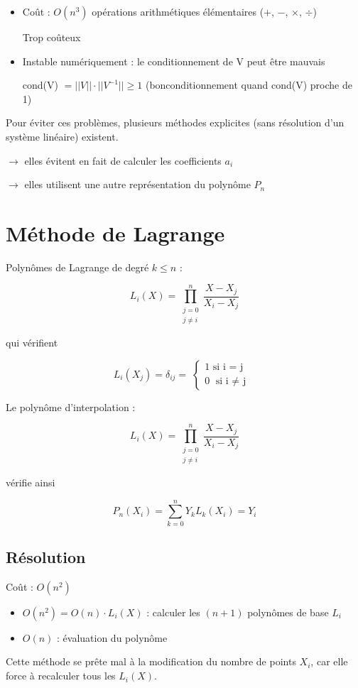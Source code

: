 \begin{itemize}
\item Coût : $O(n^3)$ opérations arithmétiques élémentaires ($+$, $-$, $\times$, $\div$)

Trop coûteux
\item Instable numériquement : le conditionnement de V peut être \og mauvais\fg

cond(V) $= ||V|| \cdot ||V^{-1}|| \ge 1$ (\og bon\fg  conditionnement quand cond(V) proche de 1)
\end{itemize}

Pour éviter ces problèmes, plusieurs méthodes explicites (sans résolution d'un système linéaire) existent.

$\rightarrow$ elles évitent en fait de calculer les coefficients $a_i$

$\rightarrow$ elles utilisent une autre représentation du polynôme $P_n$


\section {Méthode de Lagrange}

Polynômes de Lagrange de degré $k \le n$ :

\begin{equation}
    L_i(X) = \prod_{\substack{j = 0\\j \ne i}}^n \frac{X - X_j}{X_i - X_j}
\end{equation}

qui vérifient


\[
    L_i(X_j) = \delta _{ij} = \;
    \left\lbrace
    \begin{array}{cc|c}
            1 \text{ si i = j } \\
            0 \text{ si i $\ne$ j }
    \end{array}
    \right.
\]


Le polynôme d'interpolation :

\begin{equation}
    L_i(X) = \prod_{\substack{j = 0\\j \ne i}}^n \frac{X - X_j}{X_i - X_j}
\end{equation}

vérifie ainsi

\begin{equation}
    P_n(X_i) = \sum_{k = 0}^n Y_k L_k(X_i) = Y_i
\end{equation}



\subsection* {Résolution}

Coût : $O(n^2)$
\begin{itemize}
\item $O(n^2) = O(n) \cdot L_i(X)$ : calculer les $(n + 1)$ polynômes de base $L_i$
\item $O(n)$ : évaluation du polynôme
\end{itemize}

\bigbreak
Cette méthode se prête mal à la modification du nombre de points $X_i$, car elle force à recalculer tous les $L_i(X)$.


